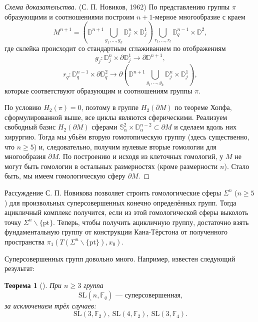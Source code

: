 \documentclass[14pt, dvipsnames]{extarticle}
\newtheorem{theorem}{Теорема}
\theoremstyle{definition}
\theoremstyle{remark}
\newtheorem*{comment}{Замечание}
\begin{document}
\begin{proof}[Схема доказательства] (С. П. Новиков, \cite{Novikov} 1962) 
По представлению группы $\pi$ образующими и соотношениями построим $n+1$-мерное многообразие с краем $$M^{n+1}=\left ( \mathbb{D}^{n+1}\bigcup\limits_{g_1, ..., g_k} \mathbb{D}^{n}_j\times \mathbb{D}^1_j \right )\bigcup\limits_{r_1, ..., r_{\ell}}\mathbb{D}^{n-1}_q\times\mathbb{D}^2,$$ где склейка происходит со стандартным сглаживанием по отображениям $$g_j: \mathbb{D}^n_j\times\partial\mathbb{D}^1_j\to \partial\mathbb{D}^{n+1},$$ $$r_q: \mathbb{D}^{n-1}_q\times\partial\mathbb{D}^2_q\to\partial\left (\mathbb{D}^{n+1}\bigcup\limits_{g_1, ..., g_k}\mathbb{D}^n_j\times\mathbb{D}^1_j \right ),$$ которые соответствуют образующим и соотношениям группы $\pi$.

По условию $H_2(\pi)=0$, поэтому в группе $H_2(\partial M)$ по теореме Хопфа, сформулированной выше, все циклы являются сферическими. Реализуем свободный базис $H_2(\partial M)$ сферами $\mathbb{S}^2_\alpha\times\mathbb{D}^{n-2}_\alpha\subset\partial M$ и сделаем вдоль них хирургию. Тогда мы убьём вторую гомотопическую группу (здесь существенно, что $n\geqslant 5$) и, следовательно, получим нулевые вторые гомологии для многообразия $\partial M$. По построению и исходя из клеточных гомологий, у $M$ не могут быть гомологии в остальных размерностях (кроме размерности $n$). Стало быть, мы имеем гомологическую сферу $\partial M$.
\end{proof}

Рассуждение С. П. Новикова позволяет строить гомологические сферы $\Sigma^n$ ($n\geqslant 5$) для произвольных суперсовершенных конечно определённых групп. Тогда ацикличный комплекс получится, если из этой гомологической сферы выколоть точку $\Sigma^n\backslash \{\mathrm{pt}\}$. Теперь, чтобы получить ацикличную группу, достаточно взять фундаментальную группу от конструкции Кана-Тёрстона от полученного пространства $\pi_1(T(\Sigma^n\backslash \{\mathrm{pt}\}), x_0)$.  

Суперсовершенных групп довольно много. Например, известен следующий результат:

\begin{theorem}[\cite{Milnor}]
При $n\geqslant 3$ группа $$\mathrm{SL}(n, \mathbb{F}_q)\text{ --- суперсовершенная,}$$ за исключением трёх случаев: $$\mathrm{SL}(3, \mathbb{F}_2),\ \mathrm{SL}(4, \mathbb{F}_2), \ \mathrm{SL}(3, \mathbb{F}_4).$$
\end{theorem} 
\end{document}
